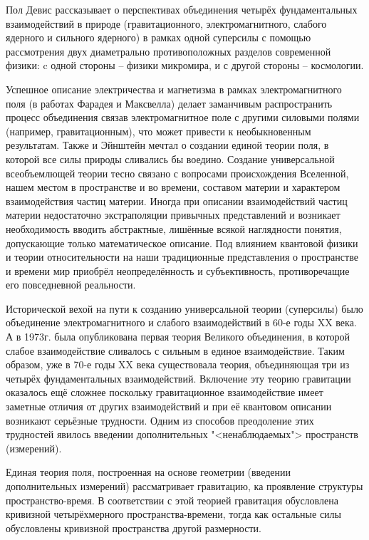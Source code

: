 \documentclass[exam_answers.tex]{subfiles}
\begin{document}
\renewcommand{\baselinestretch}{\blch}

Пол Девис рассказывает о перспективах объединения четырёх фундаментальных взаимодействий в природе (гравитационного, электромагнитного, слабого ядерного и сильного ядерного) в рамках одной суперсилы с помощью рассмотрения двух диаметрально противоположных разделов современной физики: c одной стороны -- физики микромира, и с другой стороны -- космологии.

Успешное описание электричества и магнетизма в рамках электромагнитного поля (в работах Фарадея и Максвелла) делает заманчивым распространить процесс объединения связав электромагнитное поле с другими силовыми полями (например, гравитационным), что может привести к необыкновенным результатам.
Также и Эйнштейн мечтал о создании единой теории поля, в которой все силы природы сливались бы воедино.
Создание универсальной всеобъемлющей теории тесно связано с вопросами происхождения Вселенной, нашем местом в пространстве и во времени, составом материи и характером взаимодействия частиц материи.
Иногда при описании взаимодействий частиц материи недостаточно экстраполяции привычных представлений и возникает необходимость вводить абстрактные, лишённые всякой наглядности понятия, допускающие только математическое описание.
Под влиянием квантовой физики и теории относительности на наши традиционные представления о пространстве и времени мир приобрёл неопределённость и субъективность, противоречащие его повседневной реальности.

 Исторической вехой на пути к созданию универсальной теории (суперсилы) было объединение электромагнитного и слабого взаимодействий в 60-е годы XX века.
 А в 1973г. была опубликована первая теория Великого объединения, в которой слабое взаимодействие сливалось с сильным в единое взаимодействие.
 Таким образом, уже в 70-е годы XX века существовала теория, объединяющая три из четырёх фундаментальных взаимодействий.
 Включение эту теорию гравитации оказалось ещё сложнее поскольку гравитационное взаимодействие имеет заметные отличия от других взаимодействий и при её квантовом описании возникают серьёзные трудности. Одним из способов преодоление этих трудностей явилось введении дополнительных "<ненаблюдаемых"> пространств (измерений).
 
Единая теория поля, построенная на основе геометрии (введении дополнительных измерений) рассматривает гравитацию, ка проявление структуры пространство-время. В соответствии с этой теорией гравитация обусловлена кривизной четырёхмерного пространства-времени, тогда как остальные силы обусловлены кривизной пространства другой размерности.
\end{document}

